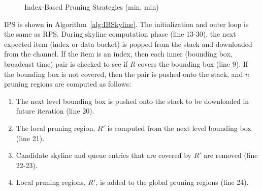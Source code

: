 \begin{figure}[!h]
  \centering
  \caption{Index-Based Pruning Strategies (min, min)}
  \label{fig:ibp}
\end{figure}

IPS is shown in Algorithm~\ref{alg:IBSkyline}. The initialization and outer loop is the same as RPS. During skyline computation phase (line 13-30), the next expected item (index or data bucket) is popped from the stack and downloaded from the channel. If the item is an index, then each inner (bounding box, broadcast time) pair is checked to see if $R$ covers the bounding box (line 9). If the bounding box is not covered, then the pair is pushed onto the stack, and $n$ pruning regions are computed as follows:

\begin{enumerate}
\item The next level bounding box is pushed onto the stack to be downloaded in future iteration (line 20).
\item The local pruning region, $R'$ is computed from the next level bounding box (line 21).
\item Candidate skyline and queue entries that are covered by $R'$ are removed (line 22-23).
\item Local pruning regions, $R'$, is added to the global pruning regions (line 24).
\end{enumerate}


